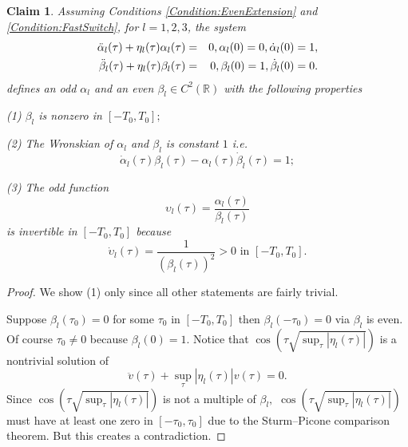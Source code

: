 \documentclass[reqno]{amsart}
\theoremstyle{plain}
\newtheorem{claim}{Claim}
\numberwithin{equation}{section}
\begin{document}
\begin{claim}
\label{Claim:Properties of Alpha and Beta}Assuming Conditions \ref{Condition:EvenExtension} and \ref{Condition:FastSwitch}, for $l=1,2,3$, the
system\begin{eqnarray}
\ddot{\alpha}_{l}(\tau )+\eta _{l}(\tau )\alpha _{l}(\tau ) &=&0,\alpha
_{l}(0)=0,\dot{\alpha}_{l}(0)=1,  \label{eqn: Alpha and Beta} \\
\ddot{\beta}_{l}(\tau )+\eta _{l}(\tau )\beta _{l}(\tau ) &=&0,\beta
_{l}(0)=1,\dot{\beta}_{l}(0)=0.  \notag
\end{eqnarray}defines an odd $\alpha _{l}$ and an even $\beta _{l}\in C^{2}(\mathbb{R})$
with the following properties

(1) $\beta _{l}$ is nonzero in $[-T_{0},T_{0}];$

(2) The Wronskian of $\alpha _{l}$ and $\beta _{l}$ is constant $1$ i.e.\begin{equation*}
\dot{\alpha}_{l}(\tau )\beta _{l}(\tau )-\alpha _{l}(\tau )\dot{\beta}_{l}(\tau )=1;
\end{equation*}

(3) The odd function\begin{equation*}
\upsilon _{l}(\tau )=\frac{\alpha _{l}(\tau )}{\beta _{l}(\tau )}
\end{equation*}is invertible in $[-T_{0},T_{0}]$ because 
\begin{equation*}
\dot{\upsilon}_{l}(\tau )=\frac{1}{\left( \beta _{l}(\tau )\right) ^{2}}>0\text{ in }[-T_{0},T_{0}].
\end{equation*}
\end{claim}

\begin{proof}
We show (1) only since all other statements are fairly trivial.

Suppose $\beta _{l}(\tau _{0})=0$ for some $\tau _{0}$ in $[-T_{0},T_{0}]$
then $\beta _{l}(-\tau _{0})=0$ via $\beta _{l}$ is even. Of course $\tau
_{0}\neq 0$ because $\beta _{l}(0)=1.$ Notice that $\cos \left( \tau \sqrt{\sup_{\tau }\left\vert \eta _{l}(\tau )\right\vert }\right) $ is a
nontrivial solution of\begin{equation*}
\ddot{v}(\tau )+\sup_{\tau }\left\vert \eta _{l}(\tau )\right\vert v(\tau
)=0.
\end{equation*}Since $\cos \left( \tau \sqrt{\sup_{\tau }\left\vert \eta _{l}(\tau
)\right\vert }\right) $ is not a multiple of $\beta _{l},$ $\cos \left( \tau 
\sqrt{\sup_{\tau }\left\vert \eta _{l}(\tau )\right\vert }\right) $ must
have at least one zero in $[-\tau _{0},\tau _{0}]$ due to the Sturm--Picone
comparison theorem. But this creates a contradiction.
\end{proof}
\end{document}
